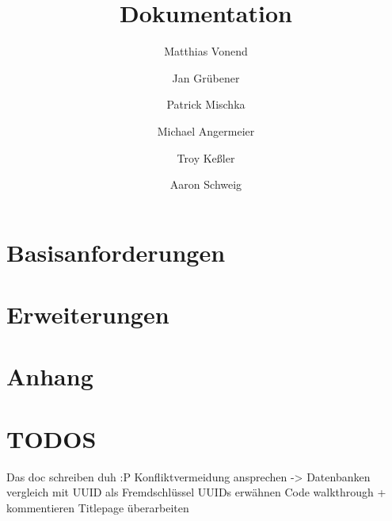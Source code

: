 \documentclass[a4paper]{article}
\title{Dokumentation}
\author{
    Matthias Vonend
    \and
    Jan Grübener
    \and
    Patrick Mischka
    \and
    Michael Angermeier
    \and
    Troy Keßler
    \and
    Aaron Schweig
    \and
}
\theoremstyle{definition}
\begin{document}
    \maketitle
    \tableofcontents

    \vspace{0.2cm}


    \section{Basisanforderungen}
        
    \section{Erweiterungen}
        
    \clearpage
    \section{Anhang}


    \section{TODOS}
        Das doc schreiben duh :P
        Konfliktvermeidung ansprechen -> Datenbanken vergleich mit UUID als Fremdschlüssel
        UUIDs erwähnen
        Code walkthrough + kommentieren
        Titlepage überarbeiten
\end{document}
